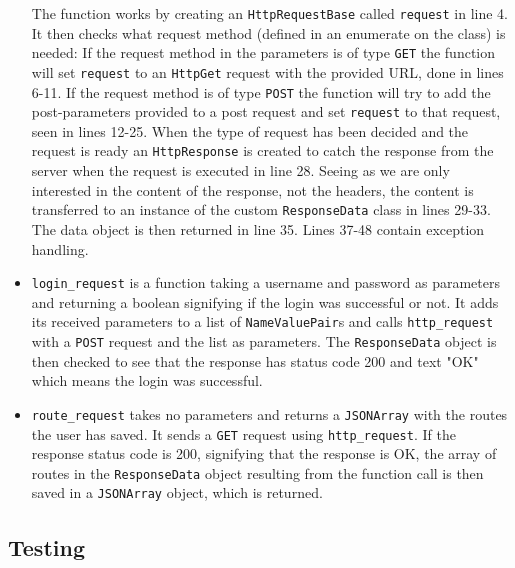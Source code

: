 \begin{itemize}
The function works by creating an \texttt{HttpRequestBase} called \texttt{request} in line 4. It then checks what request method (defined in an enumerate on the class) is needed: If the request method in the parameters is of type \texttt{GET} the function will set \texttt{request} to an \texttt{HttpGet} request with the provided URL, done in lines 6-11. If the request method is of type \texttt{POST} the function will try to add the post-parameters provided to a post request and set \texttt{request} to that request, seen in lines 12-25. When the type of request has been decided and the request is ready an \texttt{HttpResponse} is created to catch the response from the server when the request is executed in line 28. Seeing as we are only interested in the content of the response, not the headers, the content is transferred to an instance of the custom \texttt{ResponseData} class in lines 29-33. The data object is then returned in line 35. Lines 37-48 contain exception handling.
 
\item \texttt{login\_request} is a function taking a username and password as parameters and returning a boolean signifying if the login was successful or not. It adds its received parameters to a list of \texttt{NameValuePair}s and calls \texttt{http\_request} with a \texttt{POST} request and the list as parameters. The \texttt{ResponseData} object is then checked to see that the response has status code 200 and text "OK" which means the login was successful.

\item \texttt{route\_request} takes no parameters and returns a \texttt{JSONArray} with the routes the user has saved. It sends a \texttt{GET} request using \texttt{http\_request}. If the response status code is 200, signifying that the response is OK, the array of routes in the \texttt{ResponseData} object resulting from the function call is then saved in a \texttt{JSONArray} object, which is returned. 
\end{itemize}

\subsection{Testing}